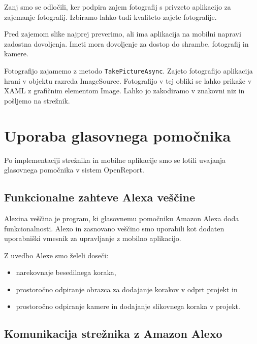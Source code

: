 \documentclass[a4paper, 12pt]{book}
\begin{document}
Zanj smo se odločili, ker podpira zajem fotografij s privzeto aplikacijo za zajemanje fotografij.
Izbiramo lahko tudi kvaliteto zajete fotografije.

Pred zajemom slike najprej preverimo, ali ima aplikacija na mobilni napravi zadostna dovoljenja.
Imeti mora dovoljenje za dostop do shrambe, fotografij in kamere.

Fotografijo zajamemo z metodo \texttt{TakePictureAsync}.
Zajeto fotografijo aplikacija hrani v objektu razreda ImageSource.
Fotografijo v tej obliki se lahko prikaže v XAML z grafičnim elementom Image.
Lahko jo zakodiramo v znakovni niz in pošljemo na strežnik.




\section{Uporaba glasovnega pomočnika}

Po implementaciji strežnika in mobilne aplikacije smo se lotili uvajanja glasovnega pomočnika v sistem OpenReport.

\subsection{Funkcionalne zahteve Alexa veščine}

Alexina veščina je program, ki glasovnemu pomočniku Amazon Alexa doda funkcionalnosti.
Alexo in zasnovano veščino smo uporabili kot dodaten uporabniški vmesnik za upravljanje z mobilno aplikacijo.

\noindent Z uvedbo Alexe smo želeli doseči:
\begin{itemize}
	\item narekovnaje besedilnega koraka,
	\item prostoročno odpiranje obrazca za dodajanje korakov v odprt projekt in
	\item prostoročno odpiranje kamere in dodajanje slikovnega koraka v projekt.
\end{itemize}


\subsection{Komunikacija strežnika z Amazon Alexo}
\end{document}

